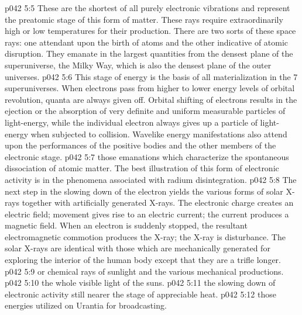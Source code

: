 \vs p042 5:5 \bibnobreakspace {} These are the shortest of all purely electronic vibrations and represent the preatomic stage of this form of matter. These rays require extraordinarily high or low temperatures for their production. There are two sorts of these space rays: one attendant upon the birth of atoms and the other indicative of atomic disruption. They emanate in the largest quantities from the densest plane of the superuniverse, the Milky Way, which is also the densest plane of the outer universes.
\vs p042 5:6 \bibnobreakspace {} This stage of energy is the basis of all materialization in the 7 superuniverses. When electrons pass from higher to lower energy levels of orbital revolution, quanta are always given off. Orbital shifting of electrons results in the ejection or the absorption of very definite and uniform measurable particles of light\hyp{}energy, while the individual electron always gives up a particle of light\hyp{}energy when subjected to collision. Wavelike energy manifestations also attend upon the performances of the positive bodies and the other members of the electronic stage.
\vs p042 5:7 \bibnobreakspace {} those emanations which characterize the spontaneous dissociation of atomic matter. The best illustration of this form of electronic activity is in the phenomena associated with radium disintegration.
\vs p042 5:8 \bibnobreakspace {} The next step in the slowing down of the electron yields the various forms of solar X\hyp{}rays together with artificially generated X\hyp{}rays. The electronic charge creates an electric field; movement gives rise to an electric current; the current produces a magnetic field. When an electron is suddenly stopped, the resultant electromagnetic commotion produces the X\hyp{}ray; the X\hyp{}ray is  disturbance. The solar X\hyp{}rays are identical with those which are mechanically generated for exploring the interior of the human body except that they are a trifle longer.
\vs p042 5:9 \bibnobreakspace {} or chemical rays of sunlight and the various mechanical productions.
\vs p042 5:10 \bibnobreakspace {} the whole visible light of the suns.
\vs p042 5:11 \bibnobreakspace {} the slowing down of electronic activity still nearer the stage of appreciable heat.
\vs p042 5:12 \bibnobreakspace {} those energies utilized on Urantia for broadcasting.

